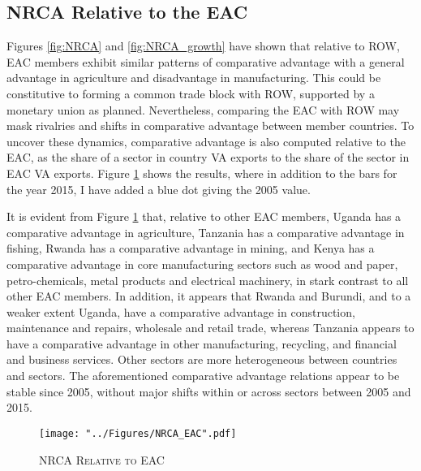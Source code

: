 \documentclass[a4paper]{article}
\begin{document}
\subsection{NRCA Relative to the EAC}
Figures \ref{fig:NRCA} and \ref{fig:NRCA_growth} have shown that relative to ROW, EAC members exhibit similar patterns of comparative advantage with a general advantage in agriculture and disadvantage in manufacturing. This could be constitutive to forming a common trade block with ROW, supported by a monetary union as planned. Nevertheless, comparing the EAC with ROW may mask rivalries and shifts in comparative advantage between member countries. To uncover these dynamics, comparative advantage is also computed relative to the EAC, as the share of a sector in country VA exports to the share of the sector in EAC VA exports. %
Figure \ref{fig:NRCA_EAC} shows the results, where in addition to the bars for the year 2015, I have added a blue dot giving the 2005 value. \newline %

It is evident from Figure \ref{fig:NRCA_EAC} that, relative to other EAC members, Uganda has a comparative advantage in agriculture, Tanzania has a comparative advantage in fishing, Rwanda has a comparative advantage in mining, and Kenya has a comparative advantage in core manufacturing sectors such as wood and paper, petro-chemicals, metal products and electrical machinery, in stark contrast to all other EAC members. In addition, it appears that Rwanda and Burundi, and to a weaker extent Uganda, have a comparative advantage in construction, maintenance and repairs, wholesale and retail trade, whereas Tanzania appears to have a comparative advantage in other manufacturing, recycling, and financial and business services. Other sectors are more heterogeneous between countries and sectors. The aforementioned comparative advantage relations appear to be stable since 2005, without major shifts within or across sectors between 2005 and 2015. \newline 

\begin{figure}[h!]
\centering
\caption{\label{fig:NRCA_EAC}\textsc{NRCA Relative to EAC}}
\texttt{[image: "../Figures/NRCA\_EAC".pdf]} %
\end{figure}
\FloatBarrier
\end{document}
